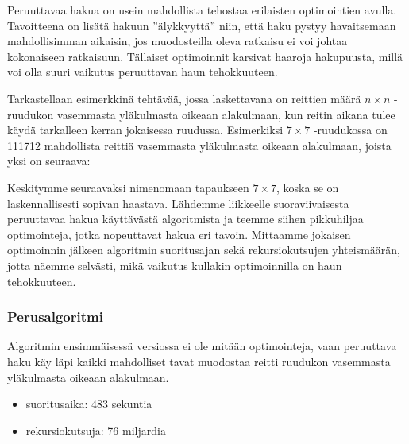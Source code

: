 Peruuttavaa hakua on usein mahdollista tehostaa
erilaisten optimointien avulla.
Tavoitteena on lisätä hakuun ''älykkyyttä''
niin, että haku pystyy havaitsemaan
mahdollisimman aikaisin,
jos muodosteilla oleva ratkaisu ei voi
johtaa kokonaiseen ratkaisuun.
Tällaiset optimoinnit karsivat haaroja
hakupuusta, millä voi olla suuri vaikutus
peruuttavan haun tehokkuuteen.

Tarkastellaan esimerkkinä tehtävää,
jossa laskettavana on reittien määrä
$n \times n$ -ruudukon
vasemmasta yläkulmasta oikeaan alakulmaan,
kun reitin aikana tulee käydä tarkalleen kerran 
jokaisessa ruudussa.
Esimerkiksi $7 \times 7$ -ruudukossa on
111712 mahdollista reittiä vasemmasta yläkulmasta
oikeaan alakulmaan, joista yksi on seuraava:

\begin{center}
\end{center}

Keskitymme seuraavaksi nimenomaan tapaukseen $7 \times 7$,
koska se on laskennallisesti sopivan haastava.
Lähdemme liikkeelle suoraviivaisesta peruuttavaa hakua
käyttävästä algoritmista
ja teemme siihen pikkuhiljaa optimointeja,
jotka nopeuttavat hakua eri tavoin.
Mittaamme jokaisen optimoinnin jälkeen
algoritmin suoritusajan sekä rekursiokutsujen yhteismäärän,
jotta näemme selvästi, mikä vaikutus kullakin
optimoinnilla on haun tehokkuuteen.

\subsubsection{Perusalgoritmi}

Algoritmin ensimmäisessä versiossa ei ole mitään optimointeja,
vaan peruuttava haku käy läpi kaikki mahdolliset tavat
muodostaa reitti ruudukon vasemmasta yläkulmasta
oikeaan alakulmaan.

\begin{itemize}
\item
suoritusaika: 483 sekuntia
\item
rekursiokutsuja: 76 miljardia
\end{itemize}

